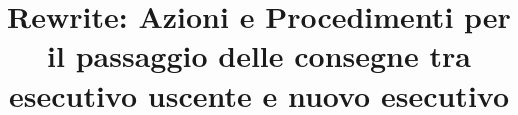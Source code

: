 

\title{Rewrite: Azioni e Procedimenti per il passaggio delle consegne tra esecutivo uscente e nuovo esecutivo}



